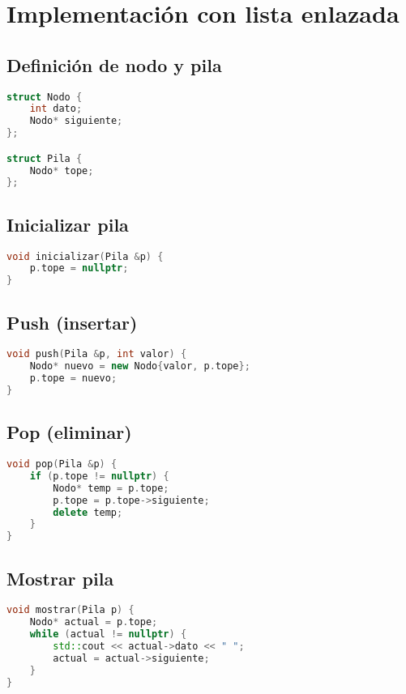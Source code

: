 \documentclass[a4paper]{article}
\begin{document}
\section{Implementación con lista enlazada}

\subsection*{Definición de nodo y pila}

\begin{lstlisting}[language=C++]
struct Nodo {
    int dato;
    Nodo* siguiente;
};

struct Pila {
    Nodo* tope;
};
\end{lstlisting}

\subsection*{Inicializar pila}

\begin{lstlisting}[language=C++]
void inicializar(Pila &p) {
    p.tope = nullptr;
}
\end{lstlisting}

\subsection*{Push (insertar)}

\begin{lstlisting}[language=C++]
void push(Pila &p, int valor) {
    Nodo* nuevo = new Nodo{valor, p.tope};
    p.tope = nuevo;
}
\end{lstlisting}

\subsection*{Pop (eliminar)}

\begin{lstlisting}[language=C++]
void pop(Pila &p) {
    if (p.tope != nullptr) {
        Nodo* temp = p.tope;
        p.tope = p.tope->siguiente;
        delete temp;
    }
}
\end{lstlisting}

\subsection*{Mostrar pila}

\begin{lstlisting}[language=C++]
void mostrar(Pila p) {
    Nodo* actual = p.tope;
    while (actual != nullptr) {
        std::cout << actual->dato << " ";
        actual = actual->siguiente;
    }
}
\end{lstlisting}
\end{document}
